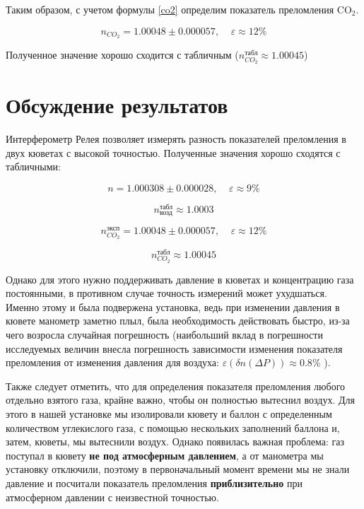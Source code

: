 Таким образом, с учетом формулы \ref{co2} определим показатель преломления CO$_2$.

 $$n_{CO_2} = 1.00048 \pm 0.000057, \;\;\;\; \varepsilon \approx 12\%$$

Полученное значение хорошо сходится с табличным ($n^\text{табл}_{CO_2} \approx 1.00045$)

\section{Обсуждение результатов}

	Интерферометр Релея позволяет измерять разность показателей преломления в двух кюветах с высокой точностью. Полученные значения хорошо сходятся с табличными:
	
	 $$n = 1.000308 \pm 0.000028, \;\;\;\; \varepsilon \approx 9 \%$$
	 
	 $$n^\text{табл}_{\text{возд}} \approx 1.0003$$
	 
	 $$n^\text{эксп}_{CO_2} = 1.00048 \pm 0.000057, \;\;\;\; \varepsilon \approx 12\%$$
	 
	 $$n^\text{табл}_{CO_2} \approx 1.00045$$

	 Однако для этого нужно поддерживать давление в кюветах и концентрацию газа постоянными, в противном случае точность измерений может ухудшаться. Именно этому и была подвержена установка, ведь при изменении давления в кювете манометр заметно плыл, была необходимость действовать быстро, из-за чего возросла случайная погрешность (наибольший вклад в погрешности исследуемых величин внесла погрешность зависимости изменения показателя преломления от изменения давления для воздуха: $\varepsilon (\delta n (\Delta P)) \approx 0.8\%$ ). 
	 
	 Также следует отметить, что для определения показателя преломления любого отдельно взятого газа, крайне важно, чтобы он полностью вытеснил воздух. Для этого в нашей установке мы изолировали кювету и баллон с определенным количеством углекислого газа, с помощью нескольких заполнений баллона и, затем, кюветы, мы вытеснили воздух. Однако появилась важная проблема: газ поступал в кювету \textbf{не под атмосферным давлением}, а от манометра мы установку отключили, поэтому в первоначальный момент времени мы не знали давление и посчитали показатель преломления \textbf{приблизительно} при атмосферном давлении с неизвестной точностью. 




